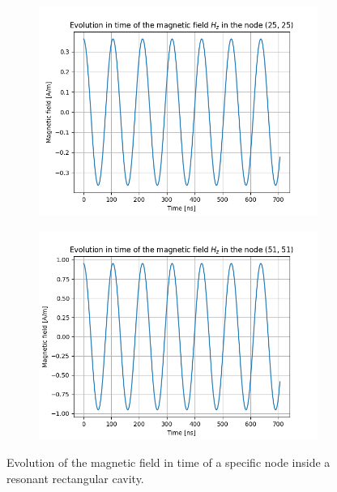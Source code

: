 \documentclass[12pt, oneside]{book}
\begin{document}
\begin{figure}[h!]
    \centering
    \begin{subfigure}[b]{0.49\textwidth}
        \centering
        \includegraphics[width=\textwidth]{Imagenes/CFDTD2D_ResonantRectangularCavity_NodeEvolution1.png}
    \end{subfigure}
    \begin{subfigure}[b]{0.49\textwidth}
        \centering
        \includegraphics[width=\textwidth]{Imagenes/CFDTD2D_ResonantRectangularCavity_NodeEvolution2.png}
    \end{subfigure}
    \caption{Evolution of the magnetic field in time of a specific node inside a resonant rectangular cavity.}
    \label{fig:CFDTD2D_RectangularResonantCavity_NodeEvolution}
\end{figure}
\end{document}
